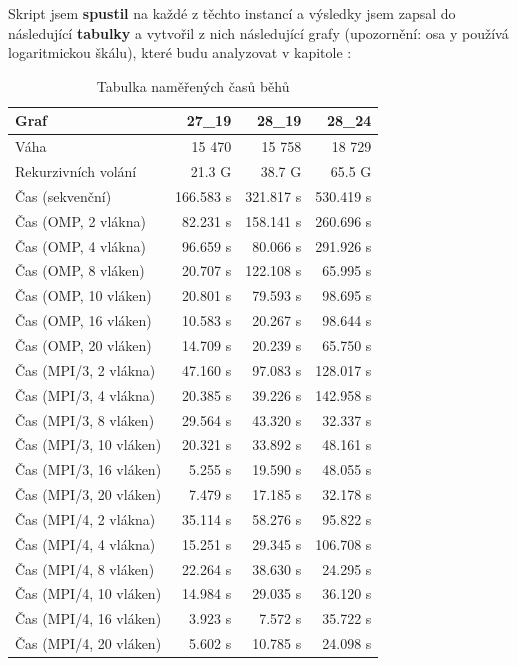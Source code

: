 Skript jsem \textbf{spustil} na každé z těchto instancí a výsledky jsem zapsal do následující \textbf{tabulky} a vytvořil z nich následující grafy (upozornění: osa y používá logaritmickou škálu), které budu analyzovat v kapitole :

\begin{table}[H]
    \centering
    \begin{tabular}{l|r|r|r}
    Graf                    & 27\_19    & 28\_19    & 28\_24    \\
    \hline
    Váha                    & 15 470    & 15 758    & 18 729    \\
    Rekurzivních volání     & 21.3 G    & 38.7 G    & 65.5 G    \\
    \hline
    Čas (sekvenční)         & 166.583 s & 321.817 s & 530.419 s \\
    \hline
    Čas (OMP, 2 vlákna)     &  82.231 s & 158.141 s & 260.696 s \\
    Čas (OMP, 4 vlákna)     &  96.659 s &  80.066 s & 291.926 s \\
    Čas (OMP, 8 vláken)     &  20.707 s & 122.108 s &  65.995 s \\
    Čas (OMP, 10 vláken)    &  20.801 s &  79.593 s &  98.695 s \\
    Čas (OMP, 16 vláken)    &  10.583 s &  20.267 s &  98.644 s \\
    Čas (OMP, 20 vláken)    &  14.709 s &  20.239 s &  65.750 s \\
    \hline
    Čas (MPI/3, 2 vlákna)   &  47.160 s &  97.083 s & 128.017 s \\
    Čas (MPI/3, 4 vlákna)   &  20.385 s &  39.226 s & 142.958 s \\
    Čas (MPI/3, 8 vláken)   &  29.564 s &  43.320 s &  32.337 s \\
    Čas (MPI/3, 10 vláken)  &  20.321 s &  33.892 s &  48.161 s \\
    Čas (MPI/3, 16 vláken)  &   5.255 s &  19.590 s &  48.055 s \\
    Čas (MPI/3, 20 vláken)  &   7.479 s &  17.185 s &  32.178 s \\
    \hline
    Čas (MPI/4, 2 vlákna)   &  35.114 s &  58.276 s &  95.822 s \\
    Čas (MPI/4, 4 vlákna)   &  15.251 s &  29.345 s & 106.708 s \\
    Čas (MPI/4, 8 vláken)   &  22.264 s &  38.630 s &  24.295 s \\
    Čas (MPI/4, 10 vláken)  &  14.984 s &  29.035 s &  36.120 s \\
    Čas (MPI/4, 16 vláken)  &   3.923 s &   7.572 s &  35.722 s \\
    Čas (MPI/4, 20 vláken)  &   5.602 s &  10.785 s &  24.098 s \\
    \end{tabular}
    \caption{Tabulka naměřených časů běhů}
    \label{4_times}
\end{table}

